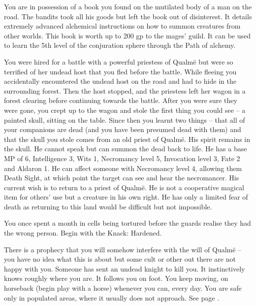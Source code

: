\begin{multicols}{2}
\begin{list}{\addtocounter{list}{1}\textbf{:}}{\raggedleft}
\item{You are in possession of a book you found on the mutilated body of a man on the road.  The bandits took all his goods but left the book out of disinterest.  It details extremely advanced alchemical instructions on how to summon creatures from other worlds.  This book is worth up to 200 gp to the mages' guild.  It can be used to learn the 5th level of the conjuration sphere through the Path of alchemy.}

\item{You were hired for a battle with a powerful priestess of Qualm\"{e} but were so terrified of her undead host that you fled before the battle.  While fleeing you accidentally encountered the undead host on the road and had to hide in the surrounding forest.  Then the host stopped, and the priestess left her wagon in a forest clearing before continuing towards the battle. After you were sure they were gone, you crept up to the wagon and stole the first thing you could see -- a painted skull, sitting on the table.  Since then you learnt two things -- that all of your companions are dead (and you have been presumed dead with them) and that the skull you stole comes from an old priest of Qualm\"{e}.  His spirit remains in the skull.  He cannot speak but can summon the dead back to life.  He has a base MP of 6, Intelligence 3, Wits 1, Necromancy level 5, Invocation level 3, Fate 2 and Aldaron 1.  He can affect someone with Necromancy level 4, allowing them Death Sight, at which point the target can see and hear the necromancer.  His current wish is to return to a priest of Qualm\"{e}.  He is not a cooperative magical item for others' use but a creature in his own right.  He has only a limited fear of death as returning to this land would be difficult but not impossible.}

\item{You once spent a month in cells being tortured before the guards realise they had the wrong person.  Begin with the Knack: Hardened.}

\item{There is a prophecy that you will somehow interfere with the will of Qualm\"{e} -- you have no idea what this is about but some cult or other out there are not happy with you.  Someone has sent an undead knight to kill you.  It instinctively knows roughly where you are.  It follows you on foot. You keep moving, on horseback (begin play with a horse) whenever you can, every day.  You are safe only in populated areas, where it usually does not approach.  See page \pageref{ghast}.}


\end{list}
\end{multicols}
